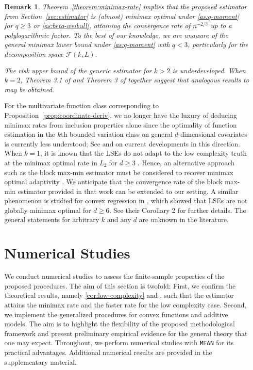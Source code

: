 \documentclass[12pt]{article}
\newtheorem{remark}{Remark}[section]
\begin{document}
\begin{remark}

 Theorem~\ref{theorem:minimax-rate} implies that the proposed estimator from Section~\ref{sec:estimator} is (almost) minimax optimal under \ref{as:q-moment} for $q \ge 3$ or \ref{as:beta-weibull}, attaining the convergence rate of $n^{-2/3}$ up to a polylogarithmic factor. To the best of our knowledge, we are unaware of the general minimax lower bound under \ref{as:q-moment} with $q < 3$, particularly for the decomposition space $\mathcal{F}(k, L)$.   

 The risk upper bound of the generic estimator for $k > 2$ is underdeveloped. When $k=2$, Theorem 3.1 of \cite{kuchibhotla2022least} and Theorem 3 of \cite{han2018robustness} together suggest that analogous results to  may be obtained.
\end{remark}


For the multivariate function class corresponding to Proposition~\ref{prop:coordinate-deriv}, we no longer have the luxury of deducing minimax rates from inclusion properties alone since the optimality of function estimation in the $k$th bounded variation class on general $d$-dimensional covariates is currently less understood; See \cite{sadhanala2017higher} and \cite{hu2022voronoigram} on current developments in this direction. When $k=1$, it is known that the LSEs do not adapt to the low complexity truth at the minimax optimal rate in $L_2$ for $d \ge 3$ \citep{han2019isotonic}. Hence, an alternative approach such as the block max-min estimator must be considered to recover minimax optimal adaptivity \citep{han2020limit}. We anticipate that the convergence rate of the block max-min estimator provided in that work can be extended to our setting. A similar phenomenon is studied for convex regression in \cite{kur2020suboptimality}, which showed that LSEs are not globally minimax optimal for $d \ge 6$. See their Corollary 2 for further details. The general statements for arbitrary $k$ and any $d$ are unknown in the literature. 

\section{Numerical Studies}\label{sec:simulation}
We conduct numerical studies to assess the finite-sample properties of the proposed procedures. The aim of this section is twofold: First, we confirm the theoretical results, namely \ref{cor:low-complexity} and , such that the estimator attains the minimax rate and the faster rate for the low complexity case. Second, we implement the generalized procedures for convex functions and additive models. The aim is to highlight the flexibility of the proposed methodological framework and present preliminary empirical evidence for the general theory that one may expect. Throughout, we perform numerical studies with \texttt{MEAN} for its practical advantages. Additional numerical results are provided in the supplementary material.
\end{document}
